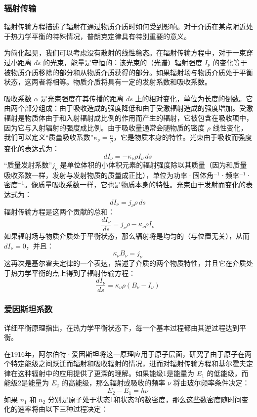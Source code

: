 \subsubsection{辐射传输}
辐射传输方程描述了辐射在通过物质介质时如何受到影响。对于介质在某点附近处于热力学平衡的特殊情况，普朗克定律具有特别重要的意义。

为简化起见，我们可以考虑没有散射的线性稳态。在辐射传输方程中，对于一束穿过小距离 \(ds\) 的光束，能量是守恒的：该光束的（光谱）辐射强度 \(I_{\nu}\) 的变化等于被物质介质移除的部分和从物质介质获得的部分。如果辐射场与物质介质处于平衡状态，这两者将相等。物质介质将具有一定的发射系数和吸收系数。

吸收系数 \(\alpha\) 是光束强度在其传播的距离 \(ds\) 上的相对变化，单位为长度的倒数。它由两个部分组成：由于吸收造成的强度降低和由于受激辐射造成的强度增加。受激辐射是物质体由于和入射辐射成比例的作用而产生的辐射，它被包含在吸收项中，因为它与入射辐射的强度成比例。由于吸收量通常会随物质的密度 \(\rho\) 线性变化，我们可以定义“质量吸收系数”\(\kappa_{\nu} = \frac{\alpha}{\rho}\)，它是物质本身的特性。光束由于吸收而强度变化的表达式为：
\[
dI_{\nu} = -\kappa_{\nu} \rho I_{\nu} \, ds~
\]
“质量发射系数”\(j_{\nu}\) 是单位体积的小体积元素的辐射强度除以其质量（因为和质量吸收系数一样，发射与发射物质的质量成正比），单位为功率·固体角\(^{-1}\)·频率\(^{-1}\)·密度\(^{-1}\)。像质量吸收系数一样，它也是物质本身的特性。光束由于发射而变化的表达式为：
\[
dI_{\nu} = j_{\nu} \rho \, ds~
\]
辐射传输方程是这两个贡献的总和：
\[
\frac{dI_{\nu}}{ds} = j_{\nu} \rho - \kappa_{\nu} \rho I_{\nu}~
\]
如果辐射场与物质介质处于平衡状态，那么辐射将是均匀的（与位置无关），从而 \(dI_{\nu} = 0\)，并且：
\[
\kappa_{\nu} B_{\nu} = j_{\nu}~
\]
这再次是基尔霍夫定律的一个表达，描述了介质的两个物质特性，并且它在介质处于热力学平衡的点上得到了辐射传输方程：
\[
\frac{dI_{\nu}}{ds} = \kappa_{\nu} \rho (B_{\nu} - I_{\nu})~
\]
\subsubsection{爱因斯坦系数}
详细平衡原理指出，在热力学平衡状态下，每一个基本过程都由其逆过程达到平衡。

在1916年，阿尔伯特·爱因斯坦将这一原理应用于原子层面，研究了由于原子在两个特定能级之间跃迁而辐射和吸收辐射的情况，进而对辐射传输方程和基尔霍夫定律在这种辐射中的应用提供了更深的理解。如果能级1是能量为 \(E_1\) 的低能级，而能级2是能量为 \(E_2\) 的高能级，那么辐射或吸收的频率 \(\nu\) 将由玻尔频率条件决定：
\[
E_2 - E_1 = h\nu~
\]
如果 \(n_1\) 和 \(n_2\) 分别是原子处于状态1和状态2的数密度，那么这些数密度随时间变化的速率将由以下三种过程决定：

